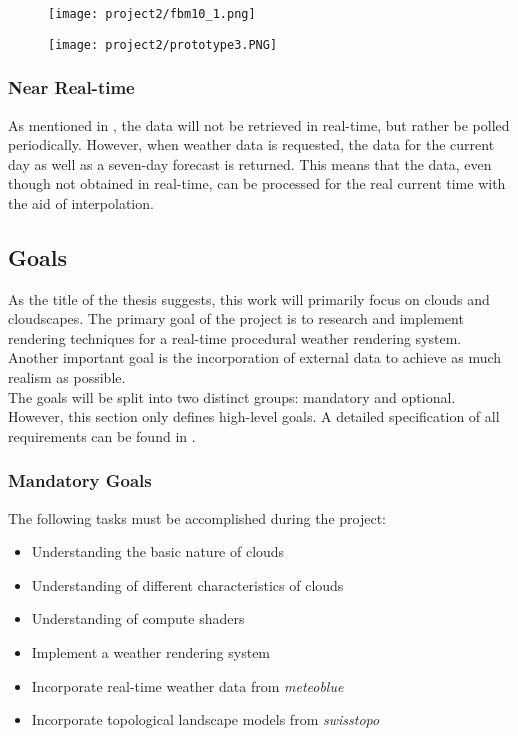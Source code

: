 \begin{figure}[H]
    \centering
        \begin{minipage}{0.47\linewidth}
            \texttt{[image: project2/fbm10\_1.png]}
        \end{minipage}
    \hfill
        \begin{minipage}{0.47\linewidth}
            \texttt{[image: project2/prototype3.PNG]}
        \end{minipage}  
\end{figure}

\subsubsection{Near Real-time}
As mentioned in , the data will not be retrieved in real-time, but rather be polled periodically.
However, when weather data is requested, the data for the current day as well as a seven-day forecast is returned.
This means that the data, even though not obtained in real-time, can be processed for the real current time with the aid of \gls{interpolation}.

\subsection{Goals}
\label{section:goals}
As the title of the thesis suggests, this work will primarily focus on clouds and cloudscapes.
The primary goal of the project is to research and implement rendering techniques for a real-time \gls{procedural} weather rendering system. Another important goal is the incorporation of external data to achieve as much realism as possible.
\\
The goals will be split into two distinct groups: mandatory and optional. However, this section only defines high-level goals. A detailed specification of all requirements can be found in .

\subsubsection{Mandatory Goals}
The following tasks must be accomplished during the project:
\begin{itemize}
    \item Understanding the basic nature of clouds
    \item Understanding of different characteristics of clouds
    \item Understanding of compute shaders
    \item Implement a weather rendering system
    \item Incorporate real-time weather data from \emph{meteoblue}
    \item Incorporate topological landscape models from \emph{swisstopo}
\end{itemize}

